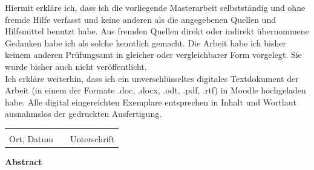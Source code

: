 \documentclass[a4paper,oneside,12pt]{report}
\begin{document}
Hiermit erkläre ich, dass ich die vorliegende Masterarbeit selbstständig und ohne fremde Hilfe verfasst und keine anderen als die angegebenen Quellen und Hilfsmittel benutzt habe. Aus fremden Quellen direkt oder indirekt übernommene Gedanken habe ich als solche kenntlich gemacht. Die Arbeit habe ich bisher keinem anderen Prüfungsamt in gleicher oder vergleichbarer Form vorgelegt. Sie wurde bisher auch nicht veröffentlicht.\\[1cm]
Ich erkläre weiterhin, dass ich ein unverschlüsseltes digitales Textdokument der Arbeit (in einem der Formate .doc, .docx, .odt, .pdf, .rtf) in Moodle hochgeladen habe. Alle digital eingereichten Exemplare entsprechen in Inhalt und Wortlaut ausnahmslos der gedruckten Ausfertigung.\\[2cm]
\begin{tabular}{ p{5cm}p{1cm}p{5cm} }
    \hrulefill & & \hrulefill\\
    Ort, Datum & & Unterschrift
\end{tabular}

\newpage

\vspace*{3cm} 
\begin{center}
    \textbf{Abstract}
\end{center}

\varabstract

\newpage

\tableofcontents

\newpage
\hypersetup{pageanchor=true}



\clearpage
	
\end{document}
